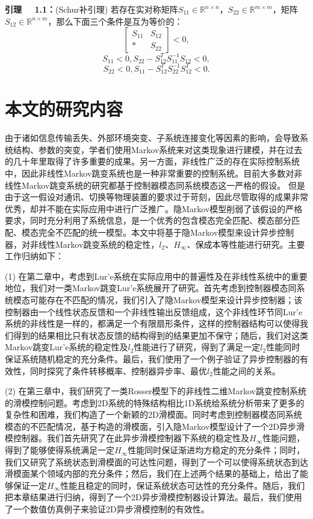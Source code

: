	{\bf 引理 \ \ 1.1：}(Schur补引理\cite{boyd1994linear}) 若存在实对称矩阵$S_{11}\in\mathbb{R}^{n\times n}$，$S_{22}\in\mathbb{R}^{m\times m}$，矩阵$S_{12}\in\mathbb{R}^{n\times m}$，那么下面三个条件是互为等价的：
	\begin{equation}
		\begin{bmatrix}
			S_{11}&S_{12}\\
			*&S_{22}
		\end{bmatrix}<0,
	\end{equation} 
	\begin{equation}
		S_{11}<0,S_{22}-S^{T}_{12}S^{-1}_{11}S_{12}<0,
	\end{equation} 
	\begin{equation}
		S_{22}<0,S_{11}-S^{T}_{12}S^{-1}_{22}S^{T}_{12}<0.
	\end{equation} 
		
\section{本文的研究内容}
	由于诸如信息传输丢失、外部环境突变、子系统连接变化等因素的影响，会导致系统结构、参数的突变，学者们使用Markov系统来对这类现象进行建模，并在过去的几十年里取得了许多重要的成果。另一方面，非线性广泛的存在实际控制系统中，因此非线性Markov跳变系统也是一种非常重要的控制系统。目前大多数对非线性Markov跳变系统的研究都基于控制器模态同系统模态这一严格的假设。 但是由于这一假设对通讯、切换等物理装置的要求过于苛刻，因此尽管取得的成果非常优秀，却并不能在实际应用中进行广泛推广。隐Markov模型削弱了该假设的严格要求，同时充分利用了系统信息，是一个优秀的包含模态完全匹配、模态部分匹配、模态完全不匹配的统一模型。本文中将基于隐Markov模型来设计异步控制器，对非线性Markov跳变系统的稳定性，$l_2$、$H_\infty$、保成本等性能进行研究。主要工作归纳如下：
	
	(1) 在第二章中，考虑到Lur'e系统在实际应用中的普遍性及在非线性系统中的重要地位，我们对一类Markov跳变Lur'e系统展开了研究。首先考虑到控制器模态同系统模态可能存在不匹配的情况，我们引入了隐Markov模型来设计异步控制器；该控制器由一个线性状态反馈和一个非线性输出反馈组成，这个非线性环节同Lur'e系统的非线性是一样的，都满足一个有限扇形条件，这样的控制器结构可以使得我们得到的结果相比只有状态反馈的结构得到的结果更加不保守；随后，我们对这类Markov跳变Lur'e系统的稳定性及$l_2$性能进行了研究，得到了满足一定$l_2$性能同时保证系统随机稳定的充分条件。最后，我们使用了一个例子验证了异步控制器的有效性，同时探究了条件转移概率、控制器异步率、最优$l_2$性能之间的关系。
	
	(2) 在第三章中，我们研究了一类Rosser模型下的非线性二维Markov跳变控制系统的滑模控制问题。考虑到2D系统的特殊结构相比1D系统给系统分析带来了更多的复杂性和困难，我们构造了一个新颖的2D滑模面。同时考虑到控制器模态同系统模态的不匹配情况，基于构造的滑模面，引入隐Markov模型设计了一个2D异步滑模控制器。我们首先研究了在此异步滑模控制器下系统的稳定性及$H_\infty$性能问题，得到了能够使得系统满足一定$H_\infty$性能同时保证渐进均方稳定的充分条件；同时，我们又研究了系统状态到滑模面的可达性问题，得到了一个可以使得系统状态到达滑模面某个领域内部的充分条件；然后，我们在上述两个结果的基础上，给出了能够保证一定$H_\infty$性能且稳定的同时，保证系统状态可达性的充分条件。随后，我们把本章结果进行归纳，得到了一个2D异步滑模控制器设计算法。最后，我们使用了一个数值仿真例子来验证2D异步滑模控制的有效性。
	
